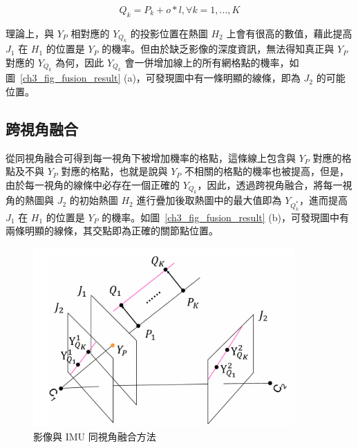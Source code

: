 \begin{equation}
   Q_k=P_k+o*l, \forall k=1,...,K
   \label{ch3_equ_cal_qk}
\end{equation}

理論上，與 $Y_P$ 相對應的 $Y_{Q_k}$ 的投影位置在熱圖 $H_2$ 上會有很高的數值，藉此提高 $J_1$ 在 $H_1$ 的位置是 $Y_P$ 的機率。但由於缺乏影像的深度資訊，無法得知真正與 $Y_P$ 對應的 $Y_{Q_k}$ 為何，因此 $Y_{Q_k}$ 會一併增加線上的所有網格點的機率，如圖~\ref{ch3_fig_fusion_result} (a)，可發現圖中有一條明顯的線條，即為 $J_2$ 的可能位置。


\subsection{跨視角融合}
從同視角融合可得到每一視角下被增加機率的格點，這條線上包含與 $Y_P$ 對應的格點及不與 $Y_P$ 對應的格點，也就是說與 $Y_P$ 不相關的格點的機率也被提高，但是，由於每一視角的線條中必存在一個正確的 $Y_{Q_k}$，因此，透過跨視角融合，將每一視角的熱圖與 $J_2$ 的初始熱圖 $H_2$ 進行疊加後取熱圖中的最大值即為 $Y_{Q_k^*}$，進而提高 $J_1$ 在 $H_1$ 的位置是 $Y_P$ 的機率。如圖~\ref{ch3_fig_fusion_result} (b)，可發現圖中有兩條明顯的線條，其交點即為正確的關節點位置。


\begin{figure}[!ht]
   \centering
   \includegraphics[width=10cm]{figure/ch3_fig_joint_project.png}
    \caption[影像與 IMU 同視角融合方法~\cite{Zhang_2020_CVPR}]{影像與 IMU 同視角融合方法~\cite{Zhang_2020_CVPR}}
    \label{ch3_fig_joint_project}
\end{figure}

